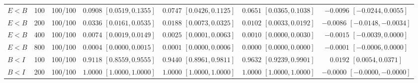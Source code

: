 \documentclass[12pt,letterpaper]{article}
\theoremstyle{plain}
\theoremstyle{definition}
\begin{document}
\begin{table}[p]
\begin{adjustbox}{max width=\linewidth}
\begin{tabular}{lrccccc}
\addlinespace
$E<B$ & 100 & 100/100 & \shortstack{$0.0908$\\{\scriptsize$[0.0519,0.1355]$}} & \shortstack{$0.0747$\\{\scriptsize$[0.0426,0.1125]$}} & \shortstack{$0.0651$\\{\scriptsize$[0.0365,0.1038]$}} & \shortstack{$-0.0096$\\{\scriptsize$[-0.0244,0.0055]$}}\\
$E<B$ & 200 & 100/100 & \shortstack{$0.0336$\\{\scriptsize$[0.0161,0.0535]$}} & \shortstack{$0.0188$\\{\scriptsize$[0.0073,0.0325]$}} & \shortstack{$0.0102$\\{\scriptsize$[0.0033,0.0192]$}} & \shortstack{$-0.0086$\\{\scriptsize$[-0.0148,-0.0034]$}}\\
$E<B$ & 400 & 100/100 & \shortstack{$0.0074$\\{\scriptsize$[0.0019,0.0149]$}} & \shortstack{$0.0025$\\{\scriptsize$[0.0001,0.0063]$}} & \shortstack{$0.0010$\\{\scriptsize$[0.0000,0.0030]$}} & \shortstack{$-0.0015$\\{\scriptsize$[-0.0039,0.0000]$}}\\
$E<B$ & 800 & 100/100 & \shortstack{$0.0004$\\{\scriptsize$[0.0000,0.0015]$}} & \shortstack{$0.0001$\\{\scriptsize$[0.0000,0.0006]$}} & \shortstack{$0.0000$\\{\scriptsize$[0.0000,0.0000]$}} & \shortstack{$-0.0001$\\{\scriptsize$[-0.0006,0.0000]$}}\\
\addlinespace
$B<I$ & 100 & 100/100 & \shortstack{$0.9118$\\{\scriptsize$[0.8559,0.9555]$}} & \shortstack{$0.9440$\\{\scriptsize$[0.8961,0.9811]$}} & \shortstack{$0.9632$\\{\scriptsize$[0.9239,0.9901]$}} & \shortstack{$0.0192$\\{\scriptsize$[0.0054,0.0371]$}}\\
$B<I$ & 200 & 100/100 & \shortstack{$1.0000$\\{\scriptsize$[1.0000,1.0000]$}} & \shortstack{$1.0000$\\{\scriptsize$[1.0000,1.0000]$}} & \shortstack{$1.0000$\\{\scriptsize$[1.0000,1.0000]$}} & \shortstack{$-0.0000$\\{\scriptsize$[-0.0000,-0.0000]$}}\\

\end{tabular}
\end{adjustbox}
\end{table}
\end{document}
